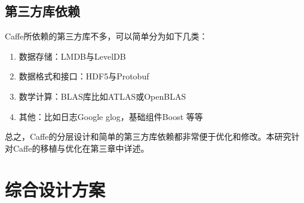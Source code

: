 \subsection{第三方库依赖}
Caffe所依赖的第三方库不多，可以简单分为如下几类：
\begin{enumerate}
\item 数据存储：LMDB与LevelDB
\item 数据格式和接口：HDF5与Protobuf
\item 数学计算：BLAS库比如ATLAS或OpenBLAS
\item 其他：比如日志Google glog，基础组件Boost 等等
\end{enumerate}

总之，Caffe的分层设计和简单的第三方库依赖都非常便于优化和修改。本研究针对Caffe的移植与优化在第三章中详述。

\section{综合设计方案}


